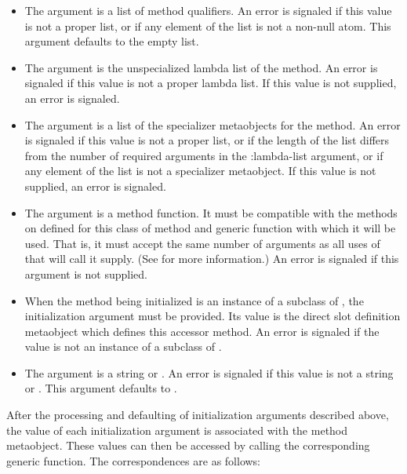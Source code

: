 \begin{itemize}
\item The  argument is a list of method qualifiers. An error is
  signaled if this value is not a proper list, or if any element of the list is
  not a non-null atom. This argument defaults to the empty list.

\item The  argument is the unspecialized lambda list of the
  method. An error is signaled if this value is not a proper lambda list. If
  this value is not supplied, an error is signaled.

\item The  argument is a list of the specializer metaobjects
  for the method. An error is signaled if this value is not a proper list, or if
  the length of the list differs from the number of required arguments in the
  :lambda-list argument, or if any element of the list is not a specializer
  metaobject. If this value is not supplied, an error is signaled.

\item The  argument is a method function. It must be compatible
  with the methods on  defined for this class of
  method and generic function with which it will be used. That is, it must
  accept the same number of arguments as all uses of  that will
  call it supply. (See  for more information.) An
  error is signaled if this argument is not supplied.

\item When the method being initialized is an instance of a subclass of
  , the  initialization
  argument must be provided. Its value is the direct slot definition metaobject
  which defines this accessor method. An error is signaled if the value is not
  an instance of a subclass of .

\item The  argument is a string or . An error is
  signaled if this value is not a string or . This argument defaults to
  .
\end{itemize}

After the processing and defaulting of initialization arguments described
above, the value of each initialization argument is associated with the
method metaobject. These values can then be accessed by calling the
corresponding generic function. The correspondences are as follows:

